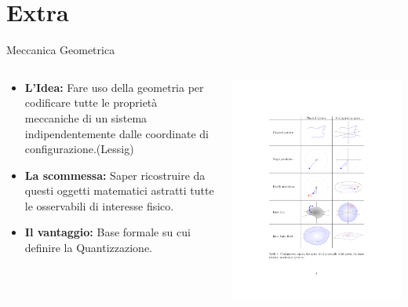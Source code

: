 \documentclass[8pt,handout]{beamer}
\begin{document}
	\section{Extra}
	\frame{\sectionpage}	

		\begin{frame}{Meccanica Geometrica}
  			\begin{columns}[T]
    			\begin{column}{.5\textwidth}		
					\begin{itemize}
						\item \textbf{L'Idea:} Fare uso della geometria per codificare tutte le proprietà meccaniche di un sistema indipendentemente dalle coordinate di configurazione.(Lessig)
						\item \textbf{La scommessa:} Saper ricostruire da questi oggetti matematici astratti tutte le osservabili di interesse fisico.
						\item \textbf{Il vantaggio:} Base formale su cui definire la Quantizzazione.
					\end{itemize}
    			\end{column}
    		   	\begin{column}{.5\textwidth}
							\includegraphics[width=\textwidth]{Presentazione/GeoMec_Crop} 				
    			\end{column}
  			\end{columns}	
	\end{frame}
\end{document}
